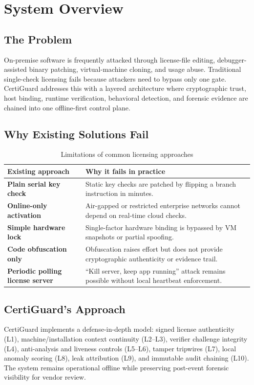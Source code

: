 \documentclass[11pt,a4paper]{article}
\begin{document}
\section{System Overview}

\subsection{The Problem}
On-premise software is frequently attacked through license-file editing, debugger-assisted binary patching, virtual-machine cloning, and usage abuse. Traditional single-check licensing fails because attackers need to bypass only one gate. CertiGuard addresses this with a layered architecture where cryptographic trust, host binding, runtime verification, behavioral detection, and forensic evidence are chained into one offline-first control plane.

\subsection{Why Existing Solutions Fail}
\begin{table}[H]
\centering
\caption{Limitations of common licensing approaches}
\begin{tabularx}{\textwidth}{>{\bfseries}lY}
\toprule
Existing approach & Why it fails in practice \\
\midrule
Plain serial key check & Static key checks are patched by flipping a branch instruction in minutes. \\
Online-only activation & Air-gapped or restricted enterprise networks cannot depend on real-time cloud checks. \\
Simple hardware lock & Single-factor hardware binding is bypassed by VM snapshots or partial spoofing. \\
Code obfuscation only & Obfuscation raises effort but does not provide cryptographic authenticity or evidence trail. \\
Periodic polling license server & ``Kill server, keep app running'' attack remains possible without local heartbeat enforcement. \\
\bottomrule
\end{tabularx}
\end{table}

\subsection{CertiGuard's Approach}
CertiGuard implements a defense-in-depth model: signed license authenticity (L1), machine/installation context continuity (L2--L3), verifier challenge integrity (L4), anti-analysis and liveness controls (L5--L6), tamper tripwires (L7), local anomaly scoring (L8), leak attribution (L9), and immutable audit chaining (L10). The system remains operational offline while preserving post-event forensic visibility for vendor review.
\end{document}
